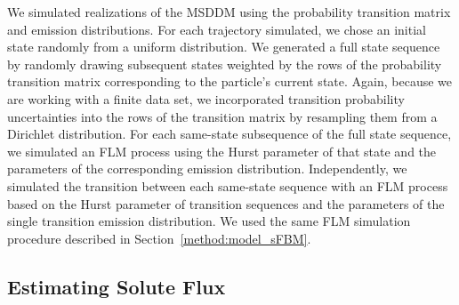 \documentclass{article}
\begin{document}
  
  We simulated realizations of the MSDDM using the probability transition matrix and 
  emission distributions. For each trajectory simulated, we chose an initial state
  randomly from a uniform distribution. We generated a full state sequence by randomly
  drawing subsequent states weighted by the rows of the probability transition matrix
  corresponding to the particle's current state. Again, because we are working with a
  finite data set, we incorporated transition probability uncertainties into the rows
  of the transition matrix by resampling them from a Dirichlet distribution. For each 
  same-state subsequence of the full state sequence, we simulated an FLM process using
  the Hurst parameter of that state and the parameters of the corresponding emission
  distribution. Independently, we simulated the transition between each same-state 
  sequence with an FLM process based on the Hurst parameter of transition sequences 
  and the parameters of the single transition emission distribution. We used the same
  FLM simulation procedure described in Section~\ref{method:model_sFBM}.


  \subsection{Estimating Solute Flux}\label{method:mfpt}
  
\end{document}
